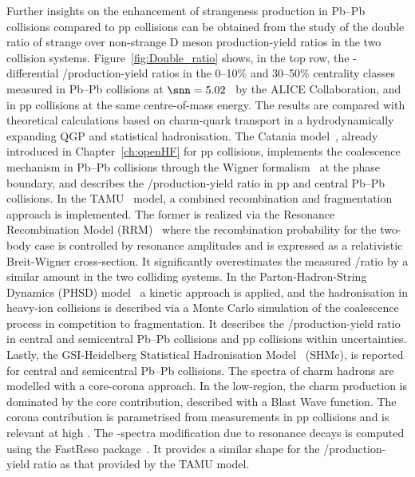 Further insights on the enhancement of strangeness production in Pb--Pb collisions compared to pp collisions can be obtained from the study of the double ratio of strange over non-strange D meson production-yield ratios in the two collision systems. Figure~\ref{fig:Double_ratio} shows, in the top row, the \pt-differential \ds/\dz production-yield ratios in the 0--10\% and 30--50\% centrality classes measured in Pb--Pb collisions at \mbox{$\snn=5.02$~\tev} by the ALICE Collaboration, and in pp collisions at the same centre-of-mass energy. The results are compared with theoretical calculations based on charm-quark transport in a hydrodynamically expanding QGP and statistical hadronisation. The Catania model~\cite{Plumari:2017ntm,Scardina:2017ipo}, already introduced in Chapter~\ref{ch:openHF} for pp collisions, implements the coalescence mechanism in Pb--Pb collisions through the Wigner formalism~\cite{Dover:1991zn} at the phase boundary, and describes the \ds/\dz production-yield ratio in pp and central Pb--Pb collisions. In the TAMU~\cite{He:2014cla} model, a combined recombination and fragmentation approach is implemented. The former is realized via the Resonance Recombination Model (RRM)~\cite{Ravagli:2007xx} where the recombination probability for the two-body case is controlled by resonance amplitudes and is expressed as a relativistic Breit-Wigner cross-section. It significantly overestimates the measured \ds/\dz ratio by a similar amount in the two colliding systems. In the Parton-Hadron-String Dynamics (PHSD) model~\cite{Song:2015sfa} a kinetic approach is applied, and the hadronisation in heavy-ion collisions is described via a Monte Carlo simulation of the coalescence process in competition to fragmentation. It describes the \ds/\dz production-yield ratio in central and semicentral Pb--Pb collisions and pp collisions within uncertainties. Lastly, the GSI-Heidelberg Statistical Hadronisation Model~\cite{Andronic:2021erx} (SHMc), is reported for central and semicentral Pb--Pb collisions. The \pt spectra of charm hadrons are modelled with a core-corona approach. In the low-\pt region, the charm production is dominated by the core contribution, described with a Blast Wave function. The corona contribution is parametrised from measurements in pp collisions and is relevant at high \pt. The \pt-spectra modification due to resonance decays is computed using the FastReso package~\cite{Mazeliauskas:2018irt}. It provides a similar \pt shape for the \ds/\dz production-yield ratio as that provided by the TAMU model.


